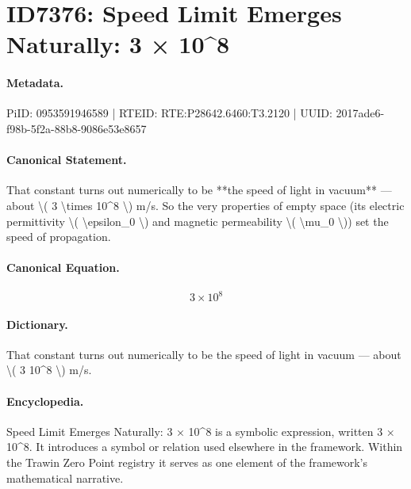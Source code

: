 \section*{ID7376: Speed Limit Emerges Naturally: 3 × 10\textasciicircum{}8}
\paragraph{Metadata.}
PiID: 0953591946589 | RTEID: RTE:P28642.6460:T3.2120 | UUID: 2017ade6-f98b-5f2a-88b8-9086e53e8657

\paragraph{Canonical Statement.}
That constant turns out numerically to be **the speed of light in vacuum** — about \textbackslash{}( 3 \textbackslash{}times 10\textasciicircum{}8 \textbackslash{}) m/s. So the very properties of empty space (its electric permittivity \textbackslash{}( \textbackslash{}epsilon\_0 \textbackslash{}) and magnetic permeability \textbackslash{}( \textbackslash{}mu\_0 \textbackslash{})) set the speed of propagation.

\paragraph{Canonical Equation.}
\[
3 \times 10^8
\]

\paragraph{Dictionary.}
That constant turns out numerically to be the speed of light in vacuum — about \textbackslash{}( 3 10\textasciicircum{}8 \textbackslash{}) m/s.

\paragraph{Encyclopedia.}
Speed Limit Emerges Naturally: 3 × 10\textasciicircum{}8 is a symbolic expression, written 3 × 10\textasciicircum{}8. It introduces a symbol or relation used elsewhere in the framework. Within the Trawin Zero Point registry it serves as one element of the framework's mathematical narrative.
